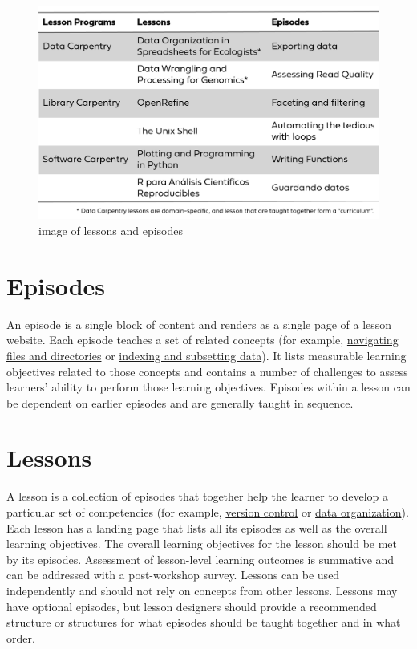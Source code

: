 \documentclass[]{book}
\begin{document}
\begin{figure}
\centering
\includegraphics{figures/leson-episode-01.png}
\caption{image of lessons and episodes}
\end{figure}

\hypertarget{episodes}{%
\section{Episodes}\label{episodes}}

An episode is a single block of content and renders as a single page of a lesson website.
Each episode teaches a set of related concepts (for example,
\href{http://swcarpentry.github.io/shell-novice/02-filedir/index.html}{navigating files and directories}
or \href{https://datacarpentry.org/python-ecology-lesson/03-index-slice-subset/index.html}{indexing and subsetting data}).
It lists measurable learning objectives related to those concepts
and contains a number of challenges to assess
learners' ability to perform those learning objectives. Episodes within a lesson can be
dependent on earlier episodes and are generally taught in sequence.

\hypertarget{lessons}{%
\section{Lessons}\label{lessons}}

A lesson is a collection of episodes that together help the learner to develop a particular
set of competencies
(for example, \href{http://swcarpentry.github.io/git-novice/}{version control} or
\href{http://www.datacarpentry.org/spreadsheets-socialsci/}{data organization}).
Each lesson has a landing page that lists all its episodes as well
as the overall learning objectives. The overall learning objectives for the lesson
should be met by its episodes. Assessment of lesson-level learning outcomes is summative and
can be addressed with a post-workshop survey. Lessons can be used independently and should
not rely on concepts from other lessons. Lessons may have optional episodes, but lesson
designers should provide a recommended structure or structures for what episodes should
be taught together and in what order.
\end{document}
